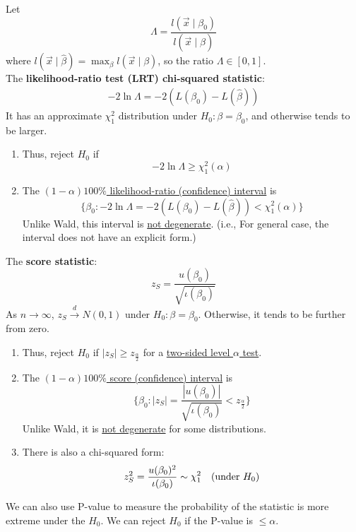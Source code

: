 \documentclass[11pt]{elegantbook}
\begin{document}
\begin{definition}
    Let $$\Lambda=\frac{l(\vec{x}\mid\beta_0)}{l(\vec{x}\mid\hat{\beta})}$$
    where $l(\vec{x}\mid\hat{\beta})=\max_{\beta}l(\vec{x}\mid\beta)$, so the ratio $\Lambda\in [0,1]$.\\
    The \textbf{likelihood-ratio test (LRT) chi-squared statistic}:
    \begin{equation}
        \begin{aligned}
            -2\ln\Lambda=-2\left(L(\beta_0)-L(\hat{\beta})\right)
        \end{aligned}
        \nonumber
    \end{equation}
    It has an approximate $\chi_1^2$ distribution under $H_0 : \beta = \beta_0$, and otherwise tends to be larger.
    \begin{enumerate}[(1)]
        \item Thus, reject $H_0$ if $$-2\ln\Lambda\geq\chi_1^2(\alpha)$$
        \item The \underline{$(1-\alpha)100\%$ likelihood-ratio (confidence) interval} is $$\{\beta_0:-2\ln\Lambda=-2\left(L(\beta_0)-L(\hat{\beta})\right)<\chi_1^2(\alpha)\}$$
        Unlike Wald, this interval is \underline{not degenerate}. (i.e., For general case, the interval does not have an explicit form.)
    \end{enumerate}
\end{definition}

\begin{definition}
    The \textbf{score statistic}: $$z_S=\frac{u(\beta_0)}{\sqrt{\iota(\beta_0)}}$$
    As $n \rightarrow \infty$, $z_S \stackrel{d}{\longrightarrow} N(0,1)$ under $H_0:\beta=\beta_0$. Otherwise, it tends to be further from zero.
    \begin{enumerate}[(1)]
        \item Thus, reject $H_0$ if $|z_S|\geq z_{\frac{\alpha}{2}}$ for a \underline{two-sided level $\alpha$ test}.
        \item The \underline{$(1-\alpha)100\%$ score (confidence) interval} is $$\{\beta_0:|z_S|=\frac{|u(\beta_0)|}{\sqrt{\iota(\beta_0)}}<z_{\frac{\alpha}{2}}\}$$
        Unlike Wald, it is \underline{not degenerate} for some distributions.
        \item There is also a chi-squared form:
        \begin{equation}
            \begin{aligned}
                z_S^2=\frac{u(\beta_0)^2}{\iota(\beta_0)}\sim \chi_1^2\quad \textnormal{(under $H_0$)}
            \end{aligned}
            \nonumber
        \end{equation}
    \end{enumerate}
\end{definition}
We can also use P-value to measure the probability of the statistic is more extreme under the $H_0$. We can reject $H_0$ if the P-value is $\leq\alpha$.
\end{document}
